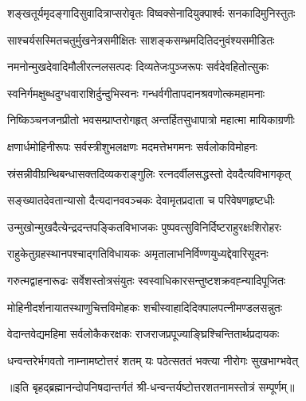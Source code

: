 \twolineshloka
{शङ्खतूर्यमृदङ्गादिसुवादित्राप्सरोवृतः}
{विष्वक्सेनादियुक्पार्श्वः सनकादिमुनिस्तुतः}

\twolineshloka
{साश्चर्यसस्मितचतुर्मुखनेत्रसमीक्षितः}
{साशङ्कसम्भ्रमदितिदनुवंश्यसमीडितः}

\twolineshloka
{नमनोन्मुखदेवादिमौलीरत्नलसत्पदः}
{दिव्यतेजःपुञ्जरूपः सर्वदेवहितोत्सुकः}

\twolineshloka
{स्वनिर्गमक्षुब्धदुग्धवाराशिर्दुन्दुभिस्वनः}
{गन्धर्वगीतापदानश्रवणोत्कमहामनाः}

\twolineshloka
{निष्किञ्चनजनप्रीतो भवसम्प्राप्तरोगहृत्}
{अन्तर्हितसुधापात्रो महात्मा मायिकाग्रणीः}

\twolineshloka
{क्षणार्धमोहिनीरूपः सर्वस्त्रीशुभलक्षणः}
{मदमत्तेभगमनः सर्वलोकविमोहनः}

\twolineshloka
{स्रंसन्नीवीग्रन्थिबन्धासक्तदिव्यकराङ्गुलिः}
{रत्नदर्वीलसद्धस्तो देवदैत्यविभागकृत्}

\twolineshloka
{सङ्ख्यातदेवतान्यासो दैत्यदानववञ्चकः}
{देवामृतप्रदाता च परिवेषणहृष्टधीः}

\twolineshloka
{उन्मुखोन्मुखदैत्येन्द्रदन्तपङ्कितविभाजकः}
{पुष्पवत्सुविनिर्दिष्टराहुरक्षःशिरोहरः}

\twolineshloka
{राहुकेतुग्रहस्थानपश्चाद्गतिविधायकः}
{अमृतालाभनिर्विण्णयुध्यद्देवारिसूदनः}

\twolineshloka
{गरुत्मद्वाहनारूढः सर्वेशस्तोत्रसंयुतः}
{स्वस्वाधिकारसन्तुष्टशक्रवह्न्यादिपूजितः}

\twolineshloka
{मोहिनीदर्शनायातस्थाणुचित्तविमोहकः}
{शचीस्वाहादिदिक्पालपत्नीमण्डलसन्नुतः}

\twolineshloka
{वेदान्तवेद्यमहिमा सर्वलोकैकरक्षकः}
{राजराजप्रपूज्याङ्घ्रिश्चिन्तितार्थप्रदायकः}

\twolineshloka
{धन्वन्तरेर्भगवतो नाम्नामष्टोत्तरं शतम्}
{यः पठेत्सततं भक्त्या नीरोगः सुखभाग्भवेत्}

{॥इति बृहद्ब्रह्मानन्दोपनिषदान्तर्गतं श्री-धन्वन्तर्यष्टोत्तरशतनामस्तोत्रं सम्पूर्णम्॥}